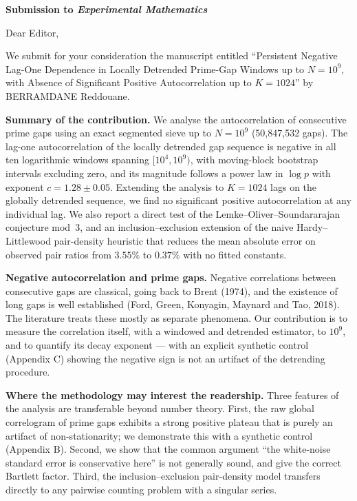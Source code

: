 \documentclass[11pt]{article}
\begin{document}
\begin{center}
{\large \textbf{Submission to \emph{Experimental Mathematics}}}
\end{center}

\bigskip
\noindent Dear Editor,

\medskip
\noindent We submit for your consideration the manuscript entitled
``Persistent Negative Lag-One Dependence in Locally Detrended
Prime-Gap Windows up to $N = 10^9$, with Absence of Significant
Positive Autocorrelation up to $K = 1024$'' by BERRAMDANE Reddouane.

\medskip
\noindent \textbf{Summary of the contribution.} We analyse the
autocorrelation of consecutive prime gaps using an exact segmented
sieve up to $N = 10^9$ (50{,}847{,}532 gaps). The lag-one
autocorrelation of the locally detrended gap sequence is negative in
all ten logarithmic windows spanning $[10^4, 10^9)$, with moving-block
bootstrap intervals excluding zero, and its magnitude follows a power
law in $\log p$ with exponent $c = 1.28 \pm 0.05$. Extending the
analysis to $K = 1024$ lags on the globally detrended sequence, we find
no significant positive autocorrelation at any individual lag. We also
report a direct test of the Lemke--Oliver--Soundararajan conjecture
mod~3, and an inclusion--exclusion extension of the naive
Hardy--Littlewood pair-density heuristic that reduces the mean absolute
error on observed pair ratios from $3.55\%$ to $0.37\%$ with no fitted
constants.

\medskip
\noindent \textbf{Negative autocorrelation and prime gaps.} Negative
correlations between consecutive gaps are classical, going back to
Brent (1974), and the existence of long gaps is well established
(Ford, Green, Konyagin, Maynard and Tao, 2018). The literature treats
these mostly as separate phenomena. Our contribution is to measure the
correlation itself, with a windowed and detrended estimator, to
$10^9$, and to quantify its decay exponent --- with an explicit
synthetic control (Appendix C) showing the negative sign is not an
artifact of the detrending procedure.

\medskip
\noindent \textbf{Where the methodology may interest the readership.}
Three features of the analysis are transferable beyond number theory.
First, the raw global correlogram of prime gaps exhibits a strong
positive plateau that is purely an artifact of non-stationarity; we
demonstrate this with a synthetic control (Appendix B). Second, we
show that the common argument ``the white-noise standard error is
conservative here'' is not generally sound, and give the correct
Bartlett factor. Third, the inclusion--exclusion pair-density model
transfers directly to any pairwise counting problem with a singular
series.
\end{document}
